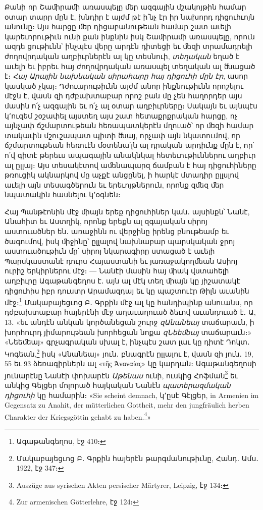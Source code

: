 \documentclass{article}
\begin{document}
{Քանի որ Շաﬕրաﬕ առասպելը ﬔր ազգային մշակոյթին համար օտար տարր մըն է, խնդիր է այժմ թէ ի՛նչ էր իր նախորդ դիցուհւոյն անունը։ Այս հարցը ﬔր դիցաբանութեան համար շատ աւելի կարեւորութիւն ունի քան ինքնին իսկ Շաﬕրաﬕ առասպելը, որուն ազդե ցութիւնն՝ ինչպէս վերը արդէն դիտեցի եւ ﬔզի տրամադրելի ժողովրդական աղբիւրներէն ալ կը տեսնուի, \emph{տեղական} եղած է աւելի եւ իբրեւ հայ ժողովրդական առասպել տեղական ալ ﬓացած է։ \emph{Հայ Արային նախնական սիրահարը հայ դիցուհի մըն էր}, ասոր կասկած չկայ։ Դժուարութիւնն այժմ անոր ինքնութիւնն որոշելու մէջն է, վասն զի դժբախտաբար որոշ բան մը չեն հաղորդեր այս մասին ո՛չ ազգային եւ ո՛չ ալ օտար աղբիւրները։ Սակայն եւ այնպէս կ՚ուզեմ շօշափել այստեղ այս շատ հետաքրքրական հարցը, ոչ այնչափ ճշմարտութեան հեռապատկերէն մղուած՝ որ ﬔզի համար տակաւին մշուշապատ պիտի ﬓայ, որչափ այն նկատումով, որ ճշմարտութեան հեռուէն մօտենա՛լն ալ դրական արդիւնք մըն է, որ՝ ո՛վ գիտէ թերեւս ապագային անակնկալ հետեւութիւններու աղբիւր ալ ըլլայ։ Այս տեսակէտով աﬔնապարզ ճամբան է հայ դիցուհիները թռուցիկ ակնարկով մը աչքէ անցընել, ի հարկէ մտադիր ըլլսլով աւելի այն տեսագծերուն եւ երեւոյթներուն, որոնք զﬔզ ﬔր նպատակին հասնելու կ՚օգնեն։

Հայ Պանթէոնին մէջ ﬕայն երեք դիցուհիներ կան․ այսինքն՝ Նանէ, Անահիտ եւ Աստղիկ, որոնք երեքն ալ զգայական սիրոյ աստուածներ են․ առաջինն ու վերջինը իրենց բնութեամբ եւ ծագումով, իսկ ﬕջինը՝ ըլլալով նախնաբար պարսկական ջրոյ աստուածութիւն մը՝ սիրոյ նկարագիրը ստացած է աւելի Պարսկաստանէ դուրս Հայաստանի եւ յառաջակողﬔան Ասիոյ ուրիշ երկիրներու մէջ։ — Նանէի մասին հայ ﬕակ վստահելի աղբիւրը Ագաթանգեղոս է․ այն ալ մէկ տեղ ﬕայն կը յիշատակէ դիցուհիս իբր դուստր Արամազդայ եւ կը պաշտուէր Թիլն աւանին մէջ։\footnote{Ագաթանգեղոս, էջ 410։} Մակաբայեցւոց Բ․ Գրքին մէջ ալ կը հանդիպինք անուանս, որ դժբախտաբար հայերէնի մէջ աղաւաղուած ձեւով աւանդուած է․ Ա, 13․ «եւ անդէն անկան կործանեցան շուրջ \emph{զԱնանեայ} տաճարաւն, ի խորհուրդ յիմարութեան խորհեցան նոքա \emph{զՆեեﬔայ} տաճարաւն։» «Նեեﬔայ» գրչագրական սխալ է, ինչպէս շատ լաւ կը դիտէ Դոկտ․ Կոգեան,\footnote{Մակաբայեցւոց Բ․ Գրքին հայերէն թարգմանութիւնը, Հանդ․ Ամս․ 1922, էջ 347։} իսկ «Անանեայ» յուն․ բնագրէն ըլլալու է, վասն զի յուն․ 19, 55 եւ 93 ձեռագիրներն ալ «τῆς Ἀναναίας» կը կարդան։ Ագաթանգեղոսի յունարէնը Նանէի փոխարէն \emph{Աթենաս} ունի, ուսկից Հոֆման\footnote{Auszüge aus syrischen Akten persischer Märtyrer, Leipzig, էջ 134։} եւ անկից Գելցեր մոլորած հայկական Նանէն \emph{պատերազմական դիցուհի} կը համարին։ «Sie scheint demnach, կ՚ըսէ Գէլցեր, in Armenien im Gegensatz zu Anahit, der mütterlichen Gottheit, mehr den jungfräulich herben Charakter der Kriegsgöttin gehabt zu haben.\footnote{Zur armenischen Götterlehre, էջ 124։}»

}
\end{document}
